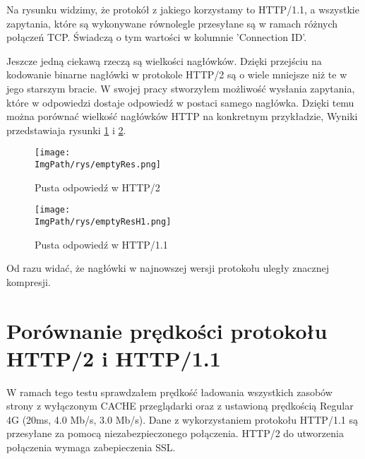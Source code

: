 \documentclass[a4paper,12pt,twoside,openany]{report}
\newcommand{\ImgPath}{.}
\begin{document}
Na rysunku widzimy, że protokół z jakiego korzystamy to HTTP/1.1, a wszystkie zapytania, które są wykonywane równolegle przesyłane są w ramach różnych połączeń TCP.
Świadczą o tym wartości w kolumnie 'Connection ID'.

Jeszcze jedną ciekawą rzeczą są wielkości nagłówków.
Dzięki przejściu na kodowanie binarne nagłówki w protokole HTTP/2 są o wiele mniejsze niż te w jego starszym bracie.
W swojej pracy stworzyłem możliwość wysłania zapytania, które w odpowiedzi dostaje odpowiedź w postaci samego nagłówka.
Dzięki temu można porównać wielkość nagłówków HTTP na konkretnym przykładzie,
Wyniki przedstawiaja rysunki \ref{schematEmptyRes} i \ref{schematEmptyResH1}.

\begin{figure}[!htbp]
	\begin{center}
\centering
\texttt{[image: \\ImgPath/rys/emptyRes.png]}
\end{center}
	\caption{Pusta odpowiedź w HTTP/2}
	\label{schematEmptyRes}
\end{figure}

\begin{figure}[!htbp]
	\begin{center}
\centering
\texttt{[image: \\ImgPath/rys/emptyResH1.png]}
\end{center}
	\caption{Pusta odpowiedź w HTTP/1.1}
	\label{schematEmptyResH1}
\end{figure}

Od razu widać, że nagłówki w najnowszej wersji protokołu uległy znacznej kompresji. 


\section{Porównanie prędkości protokołu HTTP/2 i HTTP/1.1}

W ramach tego testu sprawdzałem prędkość ładowania wszystkich zasobów strony z wyłączonym CACHE przeglądarki oraz z ustawioną prędkością Regular 4G (20ms, 4.0 Mb/s, 3.0 Mb/s).
Dane z wykorzystaniem protokołu HTTP/1.1 są przesyłane za pomocą niezabezpieczonego połączenia.
HTTP/2 do utworzenia połączenia wymaga zabepieczenia SSL.
\end{document}
